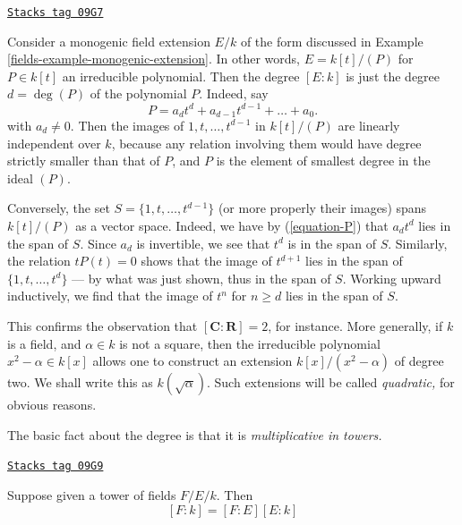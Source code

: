 \begin{example}

\label{fields-example-degree-simple-algebraic-extension}
\href{https://stacks.math.columbia.edu/tag/09G7}{\texttt{Stacks tag 09G7}}

Consider a monogenic field extension $E/k$ of the form discussed in
Example \ref{fields-example-monogenic-extension}.
In other words, $E = k[t]/(P)$ for $P \in k[t]$ an irreducible polynomial.
Then the degree $[E : k]$ is just the degree $d = \deg(P)$ of the
polynomial $P$. Indeed, say
\begin{equation}
\label{equation-P}
P = a_d t^d + a_{d - 1} t^{d - 1} + \ldots + a_0.
\end{equation}
with $a_d \not = 0$. Then the images of $1, t, \ldots, t^{d - 1}$ in
$k[t]/(P)$ are linearly independent over $k$, because any relation involving
them would have degree strictly smaller than that of $P$, and $P$ is the
element of smallest degree in the ideal $(P)$.

\medskip\noindent
Conversely, the set $S = \{1, t, \ldots, t^{d - 1}\}$ (or more
properly their images) spans $k[t]/(P)$ as a vector space.
Indeed, we have by (\ref{equation-P}) that $a_d t^d$ lies in the span of $S$.
Since $a_d$ is invertible, we see that $t^d$ is in the span of $S$.
Similarly, the relation $t P(t) = 0$ shows that the image of $t^{d + 1}$
lies in the span of $\{1, t, \ldots, t^d\}$ --- by what was just shown, thus
in the span of $S$. Working upward inductively, we find
that the image of $t^n$ for $n \geq d$ lies in the span of $S$.
\end{example}

This confirms the observation that $[\mathbf{C}: \mathbf{R}] = 2$, for
instance. More generally, if $k$ is a field, and $\alpha \in k$ is not a
square, then the irreducible polynomial $x^2 - \alpha \in k[x]$ allows one
to construct an extension $k[x]/(x^2 - \alpha)$ of degree two.
We shall write this as $k(\sqrt{\alpha})$. Such extensions will be called
{\it quadratic,} for obvious reasons.

\medskip\noindent
The basic fact about the degree is that it is {\it multiplicative in towers.}

\begin{lemma}[Multiplicativity]

\label{fields-lemma-multiplicativity-degrees}
\href{https://stacks.math.columbia.edu/tag/09G9}{\texttt{Stacks tag 09G9}}

Suppose given a tower of fields $F/E/k$. Then
$$
[F:k] = [F:E][E:k]
$$
\end{lemma}

